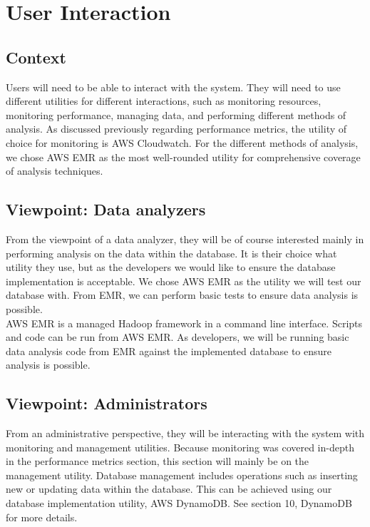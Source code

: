 \section{User Interaction}
	\subsection{Context}
    Users will need to be able to interact with the system. They will need to use different utilities for different interactions, such as monitoring resources, monitoring performance, managing data, and performing different methods of analysis. As discussed previously regarding performance metrics, the utility of choice for monitoring is AWS Cloudwatch. For the different methods of analysis, we chose AWS EMR as the most well-rounded utility for comprehensive coverage of analysis techniques.
    
    \subsection{Viewpoint: Data analyzers}
    From the viewpoint of a data analyzer, they will be of course interested mainly in performing analysis on the data within the database. It is their choice what utility they use, but as the developers we would like to ensure the database implementation is acceptable. We chose AWS EMR as the utility we will test our database with. From EMR, we can perform basic tests to ensure data analysis is possible.\\ 
    
    \noindent AWS EMR is a managed Hadoop framework in a command line interface\cite{i4}. Scripts and code can be run from AWS EMR. As developers, we will be running basic data analysis code from EMR against the implemented database to ensure analysis is possible.
    
    \subsection{Viewpoint: Administrators}
    From an administrative perspective, they will be interacting with the system with monitoring and management utilities. Because monitoring was covered in-depth in the performance metrics section, this section will mainly be on the management utility. Database management includes operations such as inserting new or updating data within the database. This can be achieved using our database implementation utility, AWS DynamoDB. See section 10, DynamoDB for more details.
    
